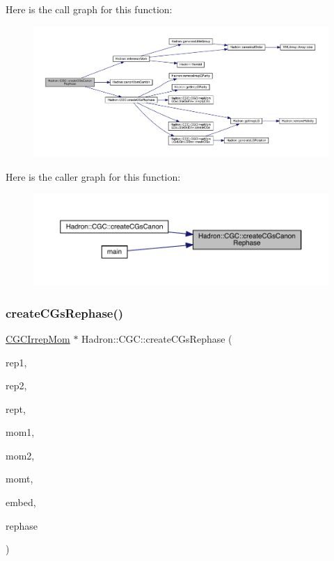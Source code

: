 Here is the call graph for this function\+:\nopagebreak
\begin{figure}[H]
\begin{center}
\leavevmode
\includegraphics[width=350pt]{d9/d19/namespaceHadron_1_1CGC_a47b736ab1ac22edb39f4b0df589a7053_cgraph}
\end{center}
\end{figure}
Here is the caller graph for this function\+:\nopagebreak
\begin{figure}[H]
\begin{center}
\leavevmode
\includegraphics[width=350pt]{d9/d19/namespaceHadron_1_1CGC_a47b736ab1ac22edb39f4b0df589a7053_icgraph}
\end{center}
\end{figure}
\mbox{\label{namespaceHadron_1_1CGC_acb590dcbf6bd9f515f07a8e64aa76c0b}} 
\subsubsection{\texorpdfstring{createCGsRephase()}{createCGsRephase()}}
{\footnotesize\ttfamily \mbox{\hyperlink{classHadron_1_1CGCIrrepMom}{C\+G\+C\+Irrep\+Mom}} $\ast$ Hadron\+::\+C\+G\+C\+::create\+C\+Gs\+Rephase (\begin{DoxyParamCaption}\item[{const std\+::string \&}]{rep1,  }\item[{const std\+::string \&}]{rep2,  }\item[{const std\+::string \&}]{rept,  }\item[{const Array\+Int \&}]{mom1,  }\item[{const Array\+Int \&}]{mom2,  }\item[{const Array\+Int \&}]{momt,  }\item[{int}]{embed,  }\item[{bool}]{rephase }\end{DoxyParamCaption})}

